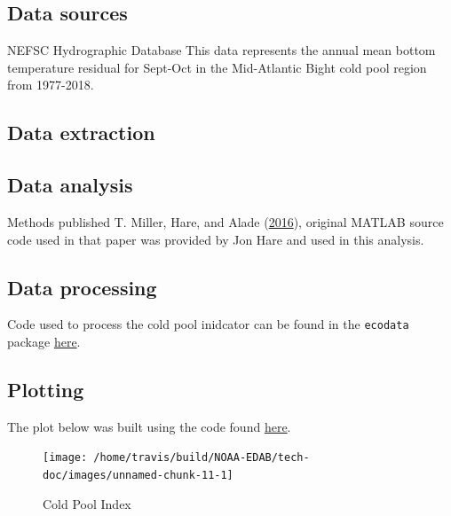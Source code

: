 \documentclass[
]{book}
\begin{document}
\hypertarget{data-sources-9}{%
\subsection{Data sources}\label{data-sources-9}}

NEFSC Hydrographic Database
This data represents the annual mean bottom temperature residual for Sept-Oct in the Mid-Atlantic Bight cold pool region from 1977-2018.

\hypertarget{data-extraction-8}{%
\subsection{Data extraction}\label{data-extraction-8}}

\hypertarget{data-analysis-8}{%
\subsection{Data analysis}\label{data-analysis-8}}

Methods published T. Miller, Hare, and Alade (\protect\hyperlink{ref-miller2016}{2016}), original MATLAB source code used in that paper was provided by Jon Hare and used in this analysis.

\hypertarget{data-processing-7}{%
\subsection{Data processing}\label{data-processing-7}}

Code used to process the cold pool inidcator can be found in the \texttt{ecodata} package \href{https://github.com/NOAA-EDAB/ecodata/blob/master/data-raw/get_cold_pool.R}{here}.

\hypertarget{plotting-6}{%
\subsection{Plotting}\label{plotting-6}}

The plot below was built using the code found
\href{https://github.com/NOAA-EDAB/ecodata/blob/master/chunk-scripts/LTL.Rmd-cold_pool.R}{here}.

\begin{figure}

{\centering \texttt{[image: /home/travis/build/NOAA-EDAB/tech-doc/images/unnamed-chunk-11-1]} 

}

\caption{Cold Pool Index}\label{fig:unnamed-chunk-11}
\end{figure}
\end{document}
